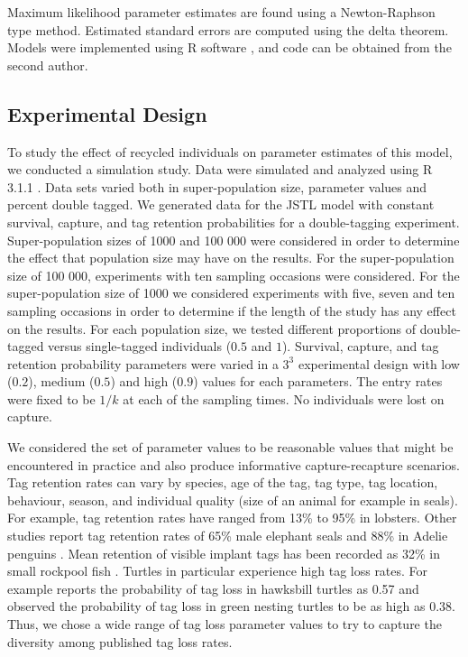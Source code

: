 \documentclass[12pt]{article}
\begin{document}
Maximum likelihood parameter estimates are found using a Newton-Raphson type
method. Estimated standard errors are computed using the delta theorem.
Models were implemented using R software \citep{R}, and code can be obtained from the second author.

\subsection{Experimental Design}\label{experimental-design}

To study the effect of recycled individuals on parameter estimates of
this model, we conducted a simulation study. Data were simulated and
analyzed using R 3.1.1 \citep{R}. Data sets varied both in super-population size,
parameter values and percent double tagged. We generated data for the
JSTL model with constant survival, capture, and tag retention
probabilities for a double-tagging experiment. Super-population sizes of
1000 and 100 000 were considered in order to determine the effect that
population size may have on the results. For the super-population size
of 100 000, experiments with ten sampling occasions were considered. For
the super-population size of 1000 we considered experiments with five,
seven and ten sampling occasions in order to determine if the length of
the study has any effect on the results. For each population size, we
tested different proportions of double-tagged versus single-tagged
individuals (\(0.5\) and \(1\)). Survival, capture, and tag retention
probability parameters were varied in a \(3^3\) experimental design with
low (\(0.2\)), medium (\(0.5\)) and high (\(0.9\)) values for each
parameters. The entry rates were fixed to be $1/k$ at each of the
sampling times. No individuals were lost on capture.

We considered the set of parameter values to be reasonable values that might be encountered in practice and also produce informative capture-recapture scenarios.  Tag retention rates can vary by species, age of the tag, tag type, tag location, behaviour, season, and individual quality (size of an animal for example in seals).  For example, tag retention rates have ranged from 13\% \citep{Fogarty:1980} to 95\% \citep{Gonzalez:2012} in lobsters.  Other studies report tag retention rates of 65\% male elephant seals \citep{Pistorius:2000} and 88\% in Adelie penguins \citep{Ainley:1980}.  Mean retention of visible implant tags has been recorded as 32\% in small rockpool fish \citep{Griffiths:2002}. Turtles in particular experience high tag loss rates.  For example \cite{Bellini:2001} reports the probability of tag loss in hawksbill turtles as 0.57 and    \cite{Bjorndal:1996} observed the probability of tag loss  in green nesting turtles to be as high as 0.38.   Thus, we chose a wide range of tag loss parameter values to try to capture the diversity among published tag loss rates.
\end{document}

